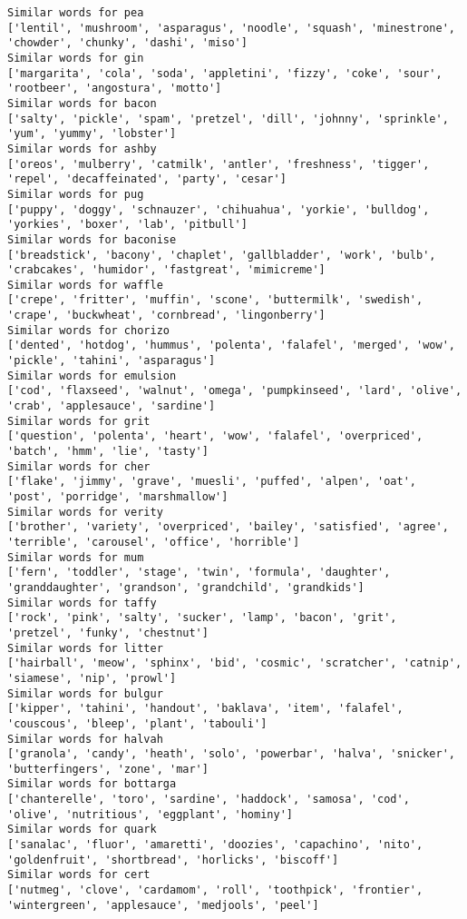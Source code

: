 \documentclass[11pt]{article}
\begin{document}
\begin{Verbatim}[commandchars=\\\{\}]
Similar words for pea
['lentil', 'mushroom', 'asparagus', 'noodle', 'squash', 'minestrone', 'chowder', 'chunky', 'dashi', 'miso']
Similar words for gin
['margarita', 'cola', 'soda', 'appletini', 'fizzy', 'coke', 'sour', 'rootbeer', 'angostura', 'motto']
Similar words for bacon
['salty', 'pickle', 'spam', 'pretzel', 'dill', 'johnny', 'sprinkle', 'yum', 'yummy', 'lobster']
Similar words for ashby
['oreos', 'mulberry', 'catmilk', 'antler', 'freshness', 'tigger', 'repel', 'decaffeinated', 'party', 'cesar']
Similar words for pug
['puppy', 'doggy', 'schnauzer', 'chihuahua', 'yorkie', 'bulldog', 'yorkies', 'boxer', 'lab', 'pitbull']
Similar words for baconise
['breadstick', 'bacony', 'chaplet', 'gallbladder', 'work', 'bulb', 'crabcakes', 'humidor', 'fastgreat', 'mimicreme']
Similar words for waffle
['crepe', 'fritter', 'muffin', 'scone', 'buttermilk', 'swedish', 'crape', 'buckwheat', 'cornbread', 'lingonberry']
Similar words for chorizo
['dented', 'hotdog', 'hummus', 'polenta', 'falafel', 'merged', 'wow', 'pickle', 'tahini', 'asparagus']
Similar words for emulsion
['cod', 'flaxseed', 'walnut', 'omega', 'pumpkinseed', 'lard', 'olive', 'crab', 'applesauce', 'sardine']
Similar words for grit
['question', 'polenta', 'heart', 'wow', 'falafel', 'overpriced', 'batch', 'hmm', 'lie', 'tasty']
Similar words for cher
['flake', 'jimmy', 'grave', 'muesli', 'puffed', 'alpen', 'oat', 'post', 'porridge', 'marshmallow']
Similar words for verity
['brother', 'variety', 'overpriced', 'bailey', 'satisfied', 'agree', 'terrible', 'carousel', 'office', 'horrible']
Similar words for mum
['fern', 'toddler', 'stage', 'twin', 'formula', 'daughter', 'granddaughter', 'grandson', 'grandchild', 'grandkids']
Similar words for taffy
['rock', 'pink', 'salty', 'sucker', 'lamp', 'bacon', 'grit', 'pretzel', 'funky', 'chestnut']
Similar words for litter
['hairball', 'meow', 'sphinx', 'bid', 'cosmic', 'scratcher', 'catnip', 'siamese', 'nip', 'prowl']
Similar words for bulgur
['kipper', 'tahini', 'handout', 'baklava', 'item', 'falafel', 'couscous', 'bleep', 'plant', 'tabouli']
Similar words for halvah
['granola', 'candy', 'heath', 'solo', 'powerbar', 'halva', 'snicker', 'butterfingers', 'zone', 'mar']
Similar words for bottarga
['chanterelle', 'toro', 'sardine', 'haddock', 'samosa', 'cod', 'olive', 'nutritious', 'eggplant', 'hominy']
Similar words for quark
['sanalac', 'fluor', 'amaretti', 'doozies', 'capachino', 'nito', 'goldenfruit', 'shortbread', 'horlicks', 'biscoff']
Similar words for cert
['nutmeg', 'clove', 'cardamom', 'roll', 'toothpick', 'frontier', 'wintergreen', 'applesauce', 'medjools', 'peel']

\end{Verbatim}
\end{document}

